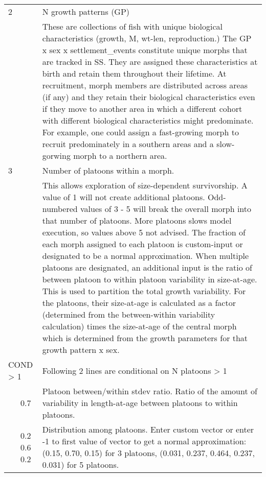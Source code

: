 \begin{center}
\begin{longtable}{p{0.5cm} p{2cm} p{12cm}}
		\hline
		2 & & N growth patterns (GP)\\
		& & These are collections of fish with unique biological characteristics (growth, M, wt-len, reproduction.)  The GP x sex x settlement\_events constitute unique morphs that are tracked in SS.  They are assigned these characteristics at birth and retain them throughout their lifetime.  At recruitment, morph members are distributed across areas (if any) and they retain their biological characteristics even if they move to another area in which a different cohort with different biological characteristics might predominate.  For example, one could assign a fast-growing morph to recruit predominately in a southern areas and a slow-gorwing morph to a northern area.\\
		\hline
		3 & & Number of platoons within a morph.\\
		& & This allows exploration of size-dependent survivorship. A value of 1 will not create additional platoons.  Odd-numbered values of 3 - 5 will break the overall morph into that number of platoons.  More platoons slows model execution, so values above 5 not advised.  The fraction of each morph assigned to each platoon is custom-input or designated to be a normal approximation.  When multiple platoons are designated, an additional input is the ratio of between platoon to within platoon variability in size-at-age.  This is used to partition the total growth variability.  For the platoons, their size-at-age is calculated as a factor (determined from the between-within variability calculation) times the size-at-age of the central morph which is determined from the growth parameters for that growth pattern x sex.\\

		\multicolumn{2}{l}{COND > 1}& \multicolumn{1}{l}{\parbox{12cm}{Following 2 lines are conditional on N platoons > 1}} \\

		& 0.7 & Platoon between/within stdev ratio. Ratio of the amount of variability in length-at-age between platoons to within platoons.\\

		& 0.2 0.6 0.2 & Distribution among platoons. Enter custom vector or enter -1 to first value of vector to get a normal approximation: (0.15, 0.70, 0.15) for 3 platoons, (0.031, 0.237, 0.464, 0.237, 0.031) for 5 platoons.\\
		\hline
	\end{longtable}
\end{center}


